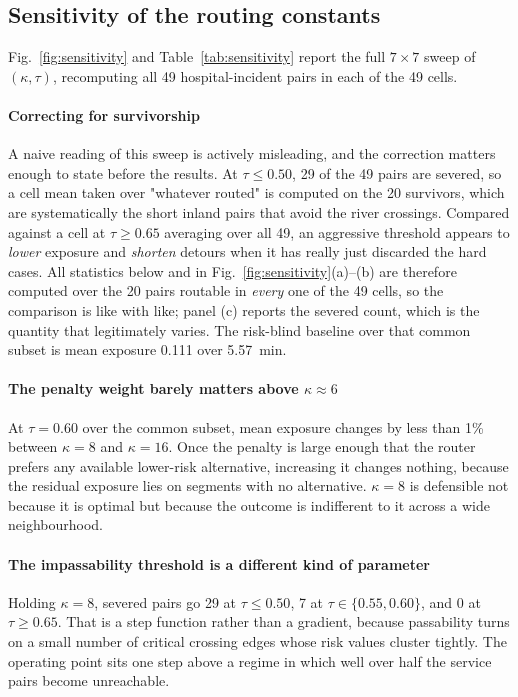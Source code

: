 \documentclass[10pt,twocolumn]{article}
\begin{document}
\subsection{Sensitivity of the routing constants}
\label{sec:res-sensitivity}

Fig.~\ref{fig:sensitivity} and Table~\ref{tab:sensitivity} report the full
$7\times7$ sweep of $(\kappa,\tau)$, recomputing all 49 hospital-incident pairs
in each of the 49 cells.

\paragraph{Correcting for survivorship} A naive reading of this sweep is
actively misleading, and the correction matters enough to state before the
results. At $\tau\le0.50$, 29 of the 49 pairs are severed, so a cell mean taken
over "whatever routed" is computed on the 20 survivors, which are systematically
the short inland pairs that avoid the river crossings. Compared against a cell at
$\tau\ge0.65$ averaging over all 49, an aggressive threshold appears to
\emph{lower} exposure and \emph{shorten} detours when it has really just discarded
the hard cases. All statistics below and in
Fig.~\ref{fig:sensitivity}(a)--(b) are therefore computed over the 20 pairs
routable in \emph{every} one of the 49 cells, so the comparison is like with
like; panel (c) reports the severed count, which is the quantity that legitimately
varies. The risk-blind baseline over that common subset is mean exposure 0.111
over \SI{5.57}{\minute}.

\paragraph{The penalty weight barely matters above $\kappa\approx6$}
At $\tau=0.60$ over the common subset, mean exposure changes by less than 1\%
between $\kappa=8$ and $\kappa=16$. Once the penalty is large enough that the
router prefers any available lower-risk alternative, increasing it changes
nothing, because the residual exposure lies on segments with no alternative.
$\kappa=8$ is defensible not because it is optimal but because the outcome is
indifferent to it across a wide neighbourhood.

\paragraph{The impassability threshold is a different kind of parameter}
Holding $\kappa=8$, severed pairs go 29 at $\tau\le0.50$, 7 at
$\tau\in\{0.55,0.60\}$, and 0 at $\tau\ge0.65$. That is a step function rather
than a gradient, because passability turns on a small number of critical crossing
edges whose risk values cluster tightly. The operating point sits one step above
a regime in which well over half the service pairs become unreachable.
\end{document}
